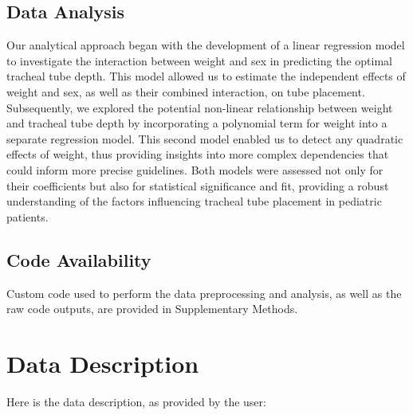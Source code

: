 \documentclass[11pt]{article}
\begin{document}
\subsection*{Data Analysis}
Our analytical approach began with the development of a linear regression model to investigate the interaction between weight and sex in predicting the optimal tracheal tube depth. This model allowed us to estimate the independent effects of weight and sex, as well as their combined interaction, on tube placement. Subsequently, we explored the potential non-linear relationship between weight and tracheal tube depth by incorporating a polynomial term for weight into a separate regression model. This second model enabled us to detect any quadratic effects of weight, thus providing insights into more complex dependencies that could inform more precise guidelines. Both models were assessed not only for their coefficients but also for statistical significance and fit, providing a robust understanding of the factors influencing tracheal tube placement in pediatric patients.\subsection*{Code Availability}

Custom code used to perform the data preprocessing and analysis, as well as the raw code outputs, are provided in Supplementary Methods.






\clearpage
\appendix

\section{Data Description} \label{sec:data_description} Here is the data description, as provided by the user:
\end{document}
